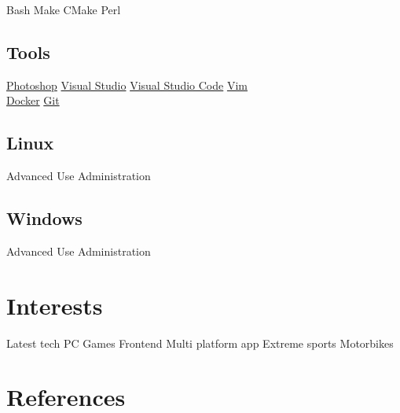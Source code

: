 \documentclass[a4paper,final]{styles/deedy-resume}%
\newcommand{\mySep}{{\color{black!40!white}\textbullet{}}}
\newcommand{\mySmallSpace}{\vspace{3pt}}
\begin{document}
\begin{minipage}[t]{0.33\textwidth}
	{\small
		Bash \mySep{}
		Make \mySep{}
		CMake \mySep{}
		Perl
		\mySmallSpace{}
	}

	\sectionspace %

	\subsection{Tools}
	{\small
		\href{http://www.adobe.com/products/photoshop.html}{Photoshop} \mySep{}
		\href{https://www.visualstudio.com/}{Visual Studio} \mySep{}
		\href{https://code.visualstudio.com/}{Visual Studio Code} \mySep{}
		\href{http://www.vim.org/}{Vim} \\
		\href{https://www.docker.com/}{Docker} \mySep{}
		\href{https://git-scm.com/}{Git}
	}

	\sectionspace %

	\subsection{Linux}
	Advanced Use \mySep{}
	Administration

	\sectionspace %

	\subsection{Windows}
	Advanced Use \mySep{}
	Administration

	\section{Interests}
	{Latest tech} \mySep{}
	{PC Games} \mySep{}
	{Frontend} \mySep{}
	{Multi platform app} \mySep{}
	{Extreme sports} \mySep{}
	{Motorbikes}
	\section{References}

	\href{https://github.com/rajzik}{}

	\sectionspace %



\end{minipage} %
\end{document}
